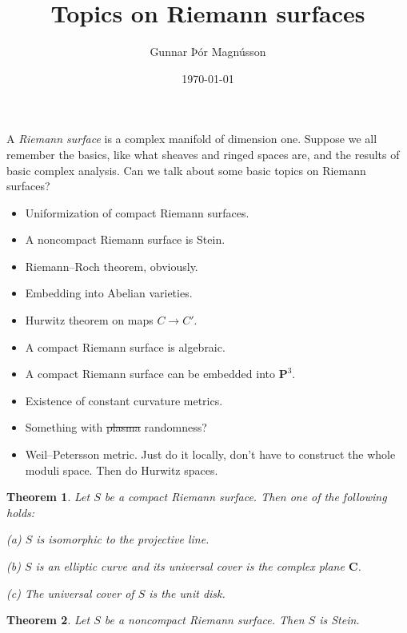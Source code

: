 \documentclass[11pt]{article}
\author{Gunnar Þór Magnússon}
\date{\today}
\title{Topics on Riemann surfaces}
\newtheorem{theo}{Theorem}[section]
\theoremstyle{definition}
\def\CC{\mathbf{C}}
\def\PP{\mathbf{P}}
\begin{document}
\maketitle


A \emph{Riemann surface} is a complex manifold of dimension one.
Suppose we all remember the basics, like what sheaves and ringed spaces are, and
the results of basic complex analysis.
Can we talk about some basic topics on Riemann surfaces?

\begin{itemize}
\item
Uniformization of compact Riemann surfaces.

\item
A noncompact Riemann surface is Stein.

\item
Riemann--Roch theorem, obviously.

\item
Embedding into Abelian varieties.

\item
Hurwitz theorem on maps $C \to C'$.

\item
A compact Riemann surface is algebraic.

\item
A compact Riemann surface can be embedded into $\PP^3$.

\item
Existence of constant curvature metrics.

\item
Something with \sout{plasma} randomness?

\item
Weil--Petersson metric.
Just do it locally, don't have to construct the whole moduli space.
Then do Hurwitz spaces.
\end{itemize}


\begin{theo}
Let $S$ be a compact Riemann surface.
Then one of the following holds:

(a) $S$ is isomorphic to the projective line.

(b) $S$ is an elliptic curve and its universal cover is the complex plane $\CC$.

(c) The universal cover of $S$ is the unit disk.
\end{theo}


\begin{theo}
Let $S$ be a noncompact Riemann surface.
Then $S$ is Stein.
\end{theo}
\end{document}
